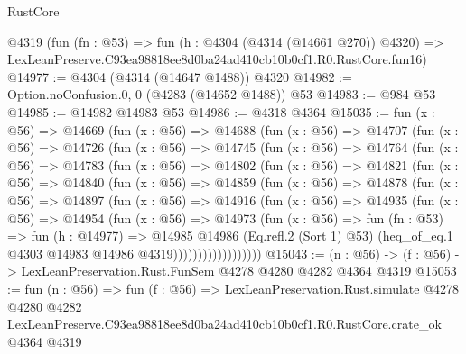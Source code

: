 \begin{lexlean}{RustCore}
\begin{coremodule}
    @4319
    (fun (fn : @53) =>
    fun (h : @4304 (@4314 (@14661 @270)) @4320) =>
    LexLeanPreserve.C93ea98818ee8d0ba24ad410cb10b0cf1.R0.RustCore.fun16)
@14977 := @4304 (@4314 (@14647 @1488)) @4320
@14982 := Option.noConfusion.{0, 0} (@4283 (@14652 @1488)) @53
@14983 := @984 @53
@14985 := @14982 @14983 @53
@14986 := @4318 @4364
@15035 := fun (x : @56) =>
  @14669
    (fun (x : @56) =>
    @14688
      (fun (x : @56) =>
      @14707
        (fun (x : @56) =>
        @14726
          (fun (x : @56) =>
          @14745
            (fun (x : @56) =>
            @14764
              (fun (x : @56) =>
              @14783
                (fun (x : @56) =>
                @14802
                  (fun (x : @56) =>
                  @14821
                    (fun (x : @56) =>
                    @14840
                      (fun (x : @56) =>
                      @14859
                        (fun (x : @56) =>
                        @14878
                          (fun (x : @56) =>
                          @14897
                            (fun (x : @56) =>
                            @14916
                              (fun (x : @56) =>
                              @14935
                                (fun (x : @56) =>
                                @14954
                                  (fun (x : @56) =>
                                  @14973
                                    (fun (x : @56) =>
                                    fun (fn : @53) =>
                                    fun (h : @14977) =>
                                    @14985
                                      @14986
                                      (Eq.refl.{2} (Sort 1) @53)
                                      (heq_of_eq.{1} @4303 @14983 @14986 @4319))))))))))))))))))
@15043 := (n : @56) -> (f : @56) -> LexLeanPreservation.Rust.FunSem @4278 @4280 @4282 @4364 @4319
@15053 := fun (n : @56) =>
  fun (f : @56) =>
  LexLeanPreservation.Rust.simulate
    @4278
    @4280
    @4282
    LexLeanPreserve.C93ea98818ee8d0ba24ad410cb10b0cf1.R0.RustCore.crate_ok
    @4364
    @4319
\end{coremodule}
\end{lexlean}
